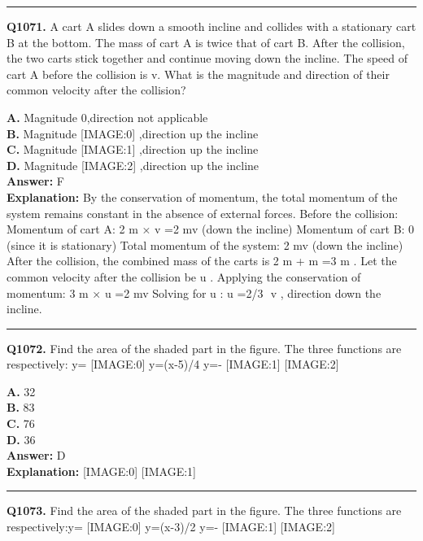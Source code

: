 \documentclass[12pt]{article}
\begin{document}
\hrule
\vspace{1em}


\noindent
\textbf{Q1071.} A cart A slides down a smooth incline and collides with a stationary cart B at the bottom. The mass of cart A is twice that of cart B. After the collision, the two carts stick together and continue moving down the incline. The speed of cart A before the collision is v. What is the magnitude and direction of their common velocity after the collision?



\textbf{A.} Magnitude 0,direction not applicable \\
\textbf{B.} Magnitude
[IMAGE:0]
,direction up the incline \\
\textbf{C.} Magnitude
[IMAGE:1]
,direction up the incline \\
\textbf{D.} Magnitude
[IMAGE:2]
,direction up the incline \\

\textbf{Answer:} F \\
\textbf{Explanation:} By the conservation of momentum, the total momentum of the system remains constant in the absence of external forces. Before the collision:
Momentum of cart A: 2
m
×
v
=2
mv
(down the incline)
Momentum of cart B: 0 (since it is stationary)
Total momentum of the system: 2
mv
(down the incline)
After the collision, the combined mass of the carts is 2
m
+
m
=3
m
. Let the common velocity after the collision be
u
. Applying the conservation of momentum:
3
m
×
u
=2
mv
Solving for
u
:
u
=2/3
​
v
, direction down the incline.

\hrule
\vspace{1em}


\noindent
\textbf{Q1072.} Find the area of the shaded part in the figure. The three functions are respectively: y=
[IMAGE:0]
y=(x-5)/4
y=-
[IMAGE:1]
[IMAGE:2]



\textbf{A.} 32 \\
\textbf{B.} 83 \\
\textbf{C.} 76 \\
\textbf{D.} 36 \\

\textbf{Answer:} D \\
\textbf{Explanation:} [IMAGE:0]
[IMAGE:1]

\hrule
\vspace{1em}


\noindent
\textbf{Q1073.} Find the area of the shaded part in the figure. The three functions are respectively:y=
[IMAGE:0]
y=(x-3)/2 y=-
[IMAGE:1]
[IMAGE:2]
\end{document}
